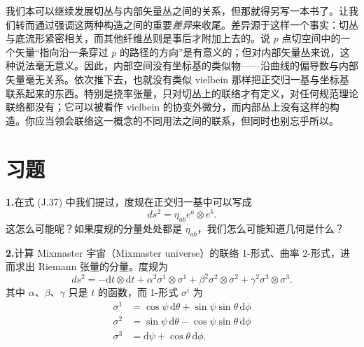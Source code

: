 我们本可以继续发展切丛与内部矢量丛之间的关系，但那就得另写一本书了。让我们转而通过强调这两种构造之间的重要\emph{差异}来收尾。差异源于这样一个事实：切丛与底流形紧密相关，而其他纤维丛则是事后才附加上去的。说 $p$ 点切空间中的一个矢量“指向沿一条穿过 $p$ 的路径的方向”是有意义的；但对内部矢量丛来说，这种说法毫无意义。因此，内部空间没有坐标基的类似物——沿曲线的偏导数与内部矢量毫无关系。依次推下去，也就没有类似 vielbein 那样把正交归一基与坐标基联系起来的东西。特别是挠率张量，只对切丛上的联络才有定义，对任何规范理论联络都没有；它可以被看作 vielbein 的协变外微分，而内部丛上没有这样的构造。你应当领会联络这一概念的不同用法之间的联系，但同时也别忘乎所以。

\section{习题}

\textbf{1.}\quad 在式 (J.37) 中我们提过，度规在正交归一基中可以写成
\begin{equation*}
ds^{2} = \eta_{ab}e^{a}\otimes e^{b}.
\tag{J.58}
\end{equation*}
这怎么可能呢？如果度规的分量处处都是 $\eta_{ab}$，我们怎么可能知道几何是什么？

\textbf{2.}\quad 计算 Mixmaster 宇宙（Mixmaster universe）的联络 1-形式、曲率 2-形式，进而求出 Riemann 张量的分量。度规为
\begin{equation*}
ds^{2} = -\mathrm{d}t\otimes\mathrm{d}t + \alpha^{2}\sigma^{1}\otimes\sigma^{1} + \beta^{2}\sigma^{2}\otimes\sigma^{2} + \gamma^{2}\sigma^{3}\otimes\sigma^{3}.
\end{equation*}
其中 $\alpha$、$\beta$、$\gamma$ 只是 $t$ 的函数，而 1-形式 $\sigma^{i}$ 为
\begin{align*}
\sigma^{1} &= \cos\psi\,\mathrm{d}\theta + \sin\psi\sin\theta\,\mathrm{d}\phi \\
\sigma^{2} &= \sin\psi\,\mathrm{d}\theta - \cos\psi\sin\theta\,\mathrm{d}\phi \\
\sigma^{3} &= \mathrm{d}\psi + \cos\theta\,\mathrm{d}\phi.
\end{align*}
